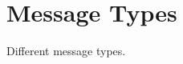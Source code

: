 \hypertarget{group__message__types}{\section{Message Types}
\label{group__message__types}
}


Different message types.  



